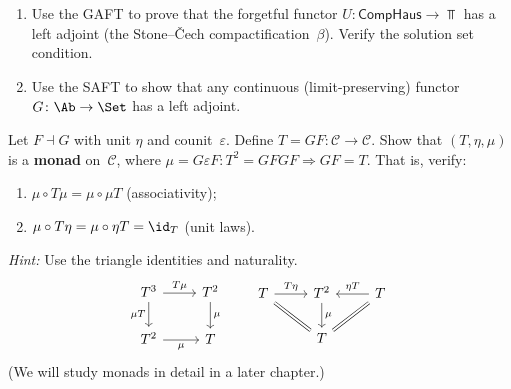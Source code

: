\begin{exercise}\label{exer:GAFT-apply}
\begin{enumerate}[label=(\alph*)]
\item Use the GAFT to prove that the forgetful functor
    $U\colon\mathsf{CompHaus}\to\Top$ has a left adjoint
    (the Stone--\v{C}ech compactification~$\beta$).
    Verify the solution set condition.
\item Use the SAFT to show that any continuous (limit-preserving)
    functor $G\colon\Ab\to\Set$ has a left adjoint.
\end{enumerate}
\end{exercise}

\begin{exercise}\label{exer:adj-monad}
Let $F\dashv G$ with unit $\eta$ and counit~$\varepsilon$.
Define $T = GF\colon\mathcal{C}\to\mathcal{C}$.
Show that $(T,\eta,\mu)$ is a \textbf{monad} on~$\mathcal{C}$,
where $\mu = G\varepsilon F\colon T^2 = GFGF\Rightarrow GF = T$.
That is, verify:
\begin{enumerate}[label=(\alph*)]
\item $\mu\circ T\mu = \mu\circ\mu T$ (associativity);
\item $\mu\circ T\eta = \mu\circ\eta T = \id_T$ (unit laws).
\end{enumerate}
\emph{Hint:} Use the triangle identities and naturality.
\[
\begin{tikzcd}
T^3 \arrow[r, "T\mu"] \arrow[d, "\mu T"'] & T^2 \arrow[d, "\mu"] \\
T^2 \arrow[r, "\mu"'] & T
\end{tikzcd}
\qquad
\begin{tikzcd}
T \arrow[r, "T\eta"] \arrow[dr, equal] & T^2 \arrow[d, "\mu"]
  & T \arrow[l, "\eta T"'] \arrow[dl, equal] \\
& T &
\end{tikzcd}
\]
(We will study monads in detail in a later chapter.)
\end{exercise}

